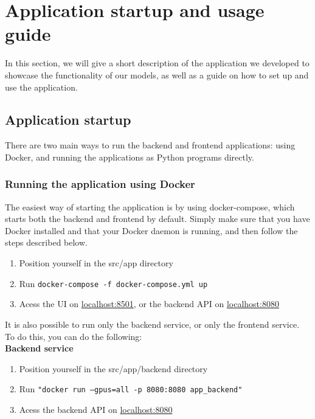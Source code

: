 \documentclass{ol-softwaremanual}
\begin{document}
\section{Application startup and usage guide}

In this section, we will give a short description of the application we developed to showcase the functionality of our models, as well as a guide on how to set up and use the application. 

\subsection{Application startup}

There are two main ways to run the backend and frontend applications: using Docker, and running the applications as Python programs directly.

\subsubsection{Running the application using Docker}

The easiest way of starting the application is by using docker-compose, which starts both the backend and frontend by default. Simply make sure that you have Docker installed and that your Docker daemon is running, and then follow the steps described below.

\begin{enumerate}
\item Position yourself in the src/app directory
\item Run \texttt{docker-compose -f docker-compose.yml up}
\item Acess the UI on \url{localhost:8501}, or the backend API on \url{localhost:8080}
\end{enumerate}

It is also possible to run only the backend service, or only the frontend service. To do this, you can do the following: \\

\textbf{Backend service}
\begin{enumerate}
\item Position yourself in the src/app/backend directory
\item Run \texttt{"docker run --gpus=all -p 8080:8080 app\_backend"}
\item Acess the backend API on \url{localhost:8080}
\end{enumerate} \\
\end{document}
